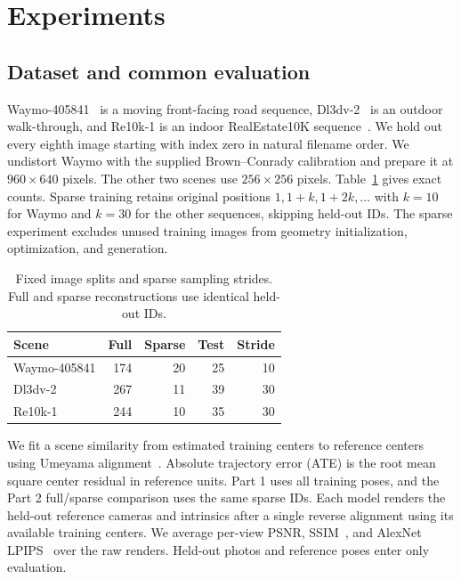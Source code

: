 \section{Experiments}
\label{sec:experiments}
\subsection{Dataset and common evaluation}
Waymo-405841~\cite{sun2020waymo} is a moving front-facing road sequence, Dl3dv-2~\cite{ling2024dl3dv} is an outdoor walk-through, and Re10k-1 is an indoor RealEstate10K sequence~\cite{zhou2018stereo}. We hold out every eighth image starting with index zero in natural filename order. We undistort Waymo with the supplied Brown--Conrady calibration and prepare it at $960\times640$ pixels. The other two scenes use $256\times256$ pixels. Table~\ref{tab:splits} gives exact counts. Sparse training retains original positions $1,1+k,1+2k,\dots$ with $k=10$ for Waymo and $k=30$ for the other sequences, skipping held-out IDs. The sparse experiment excludes unused training images from geometry initialization, optimization, and generation.

\begin{table}[t]
  \centering\small
  \begin{tabular}{lrrrr}
    \toprule
    Scene & Full & Sparse & Test & Stride \\
    \midrule
    Waymo-405841 & 174 & 20 & 25 & 10 \\
    Dl3dv-2 & 267 & 11 & 39 & 30 \\
    Re10k-1 & 244 & 10 & 35 & 30 \\
    \bottomrule
  \end{tabular}
  \caption{Fixed image splits and sparse sampling strides. Full and sparse reconstructions use identical held-out IDs.}
  \label{tab:splits}
\end{table}

We fit a scene similarity from estimated training centers to reference centers using Umeyama alignment~\cite{umeyama1991least}. Absolute trajectory error (ATE) is the root mean square center residual in reference units. Part 1 uses all training poses, and the Part 2 full/sparse comparison uses the same sparse IDs. Each model renders the held-out reference cameras and intrinsics after a single reverse alignment using its available training centers. We average per-view PSNR, SSIM~\cite{wang2004ssim}, and AlexNet LPIPS~\cite{zhang2018lpips} over the raw renders. Held-out photos and reference poses enter only evaluation.

